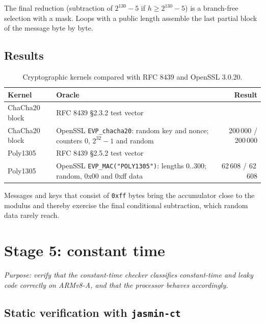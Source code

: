 \documentclass[11pt,a4paper]{article}
\newcommand{\yes}{\checkmark}
\newcommand{\file}[1]{\texttt{#1}}
\begin{document}


The final reduction (subtraction of $2^{130}-5$ if $h \ge 2^{130}-5$) is a
branch-free selection with a mask. Loops with a public length assemble the
last partial block of the message byte by byte.

\subsection{Results}

\begin{table}[h]
\centering\small
\begin{tabularx}{\textwidth}{@{}lXr@{}}
\toprule
\textbf{Kernel} & \textbf{Oracle} & \textbf{Result} \\
\midrule
ChaCha20 block & RFC 8439 \S2.3.2 test vector & \yes \\
ChaCha20 block & OpenSSL \texttt{EVP\_chacha20}: random key and nonce; counters $0$, $2^{32}-1$ and random & 200\,000 / 200\,000 \\
Poly1305 & RFC 8439 \S2.5.2 test vector & \yes \\
Poly1305 & OpenSSL \texttt{EVP\_MAC("POLY1305")}: lengths 0..300; random, 0x00 and 0xff data & 62\,608 / 62\,608 \\
\bottomrule
\end{tabularx}
\caption{Cryptographic kernels compared with RFC 8439 and OpenSSL 3.0.20.}
\end{table}

Messages and keys that consist of \texttt{0xff} bytes bring the accumulator
close to the modulus and thereby exercise the final conditional
subtraction, which random data rarely reach.

\section{Stage 5: constant time}

\emph{Purpose: verify that the constant-time checker classifies
constant-time and leaky code correctly on ARMv8-A, and that the processor
behaves accordingly.}

\subsection{Static verification with \texttt{jasmin-ct}}
\end{document}
